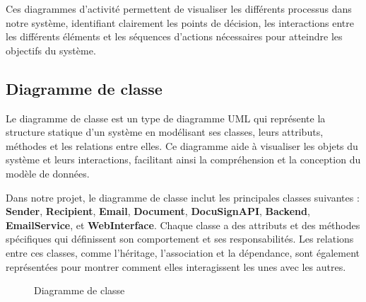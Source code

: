 Ces diagrammes d’activité permettent de visualiser les différents processus dans notre système, identifiant clairement les points de décision, les interactions entre les différents éléments et les séquences d'actions nécessaires pour atteindre les objectifs du système.




\subsection{Diagramme de classe}


Le diagramme de classe est un type de diagramme UML qui représente la structure statique d'un système en modélisant ses classes, leurs attributs, méthodes et les relations entre elles. Ce diagramme aide à visualiser les objets du système et leurs interactions, facilitant ainsi la compréhension et la conception du modèle de données.

Dans notre projet, le diagramme de classe inclut les principales classes suivantes : \textbf{Sender}, \textbf{Recipient}, \textbf{Email}, \textbf{Document}, \textbf{DocuSignAPI}, \textbf{Backend}, \textbf{EmailService}, et \textbf{WebInterface}. Chaque classe a des attributs et des méthodes spécifiques qui définissent son comportement et ses responsabilités. Les relations entre ces classes, comme l'héritage, l'association et la dépendance, sont également représentées pour montrer comment elles interagissent les unes avec les autres.


\begin{figure}[H]
\begin{center}
\end{center}
\caption{Diagramme de classe }
\end{figure}


